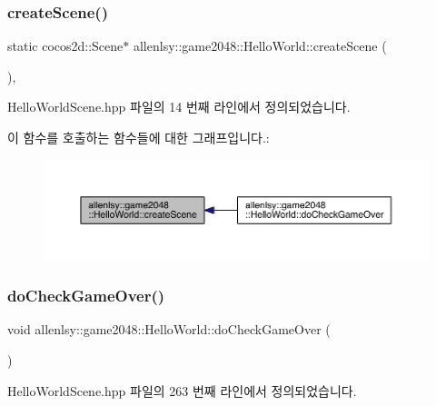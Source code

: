 \subsubsection{\texorpdfstring{create\+Scene()}{createScene()}}
{\footnotesize\ttfamily static cocos2d\+::\+Scene$\ast$ allenlsy\+::game2048\+::\+Hello\+World\+::create\+Scene (\begin{DoxyParamCaption}{ }\end{DoxyParamCaption})\hspace{0.3cm}{\ttfamily [inline]}, {\ttfamily [static]}}



Hello\+World\+Scene.\+hpp 파일의 14 번째 라인에서 정의되었습니다.

이 함수를 호출하는 함수들에 대한 그래프입니다.\+:
\nopagebreak
\begin{figure}[H]
\begin{center}
\leavevmode
\includegraphics[width=350pt]{classallenlsy_1_1game2048_1_1_hello_world_a86ca8a563151e5e5d308f98ff6c36f95_icgraph}
\end{center}
\end{figure}
\mbox{\label{classallenlsy_1_1game2048_1_1_hello_world_a4f9c99959e2c14cd349470d305909fca}} 
\subsubsection{\texorpdfstring{do\+Check\+Game\+Over()}{doCheckGameOver()}}
{\footnotesize\ttfamily void allenlsy\+::game2048\+::\+Hello\+World\+::do\+Check\+Game\+Over (\begin{DoxyParamCaption}{ }\end{DoxyParamCaption})\hspace{0.3cm}{\ttfamily [inline]}}



Hello\+World\+Scene.\+hpp 파일의 263 번째 라인에서 정의되었습니다.

